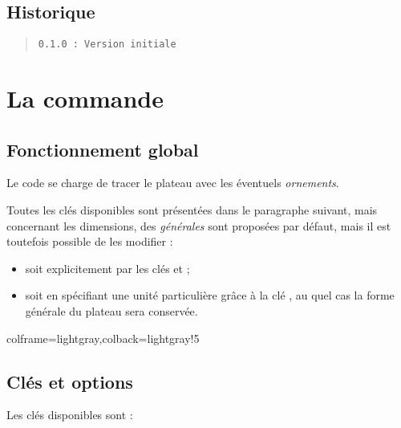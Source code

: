 \documentclass[11pt,a4paper]{ltxdoc}
\begin{document}
\vfill

\subsection{Historique}

\begin{quote}
\begin{verbatim}
0.1.0 : Version initiale
\end{verbatim}
\end{quote}

\pagebreak

\section{La commande}

\subsection{Fonctionnement global}

Le code se charge de tracer le plateau avec les éventuels \textit{ornements}.

Toutes les clés disponibles sont présentées dans le paragraphe suivant, mais concernant les dimensions, des \textit{générales} sont proposées par défaut, mais il est toutefois possible de les modifier :

\begin{itemize}
	\item soit explicitement par les clés \MontreCode{[Rayon=]} et \MontreCode{[HauteurCases=]} ;
	\item soit en spécifiant une unité particulière grâce à la clé \MontreCode{[Unite=]}, au quel cas la forme générale du plateau sera conservée.
\end{itemize}

\begin{tcblisting}{colframe=lightgray,colback=lightgray!5}
\PlateauTrivialPursuit[Unite=0.5]
%
\PlateauTrivialPursuit[Rayon=4,HauteurCases=1.25] %

\PlateauTrivialPursuit[Unite=0.33] %
\end{tcblisting}

\pagebreak

\subsection{Clés et options}

Les \textsf{clés} disponibles sont :
\end{document}
